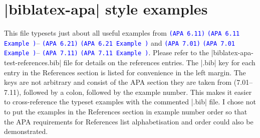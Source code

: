 \documentclass[paper=a4]{article}
\newcommand\apa[2][]{\ifthenelse{\equal{#1}{}}%
                       {\textcolor{blue}{\texttt{(APA #2)}}}%
                       {\textcolor{blue}{\texttt{(APA #2 Example #1)}}}}
\begin{document}
\section*{|biblatex-apa| style examples}
This file typesets just about all useful examples from
\apa{6.11}--\apa{6.21} and \apa{7.01}--\apa{7.11}. Please refer to the
|biblatex-apa-test-references.bib| file for details on the references
entries. The |.bib| key for each entry in the References section is listed
for convenience in the left margin. The keys are not arbitrary and consist
of the APA section they are taken from (7.01--7.11), followed by a colon,
followed by the example number. This makes it easier to cross-reference
the typeset examples with the commented |.bib| file. I chose not to put the
examples in the References section in example number order so that the APA
requirements for References list alphabetisation and order could also be
demonstrated.
\end{document}

